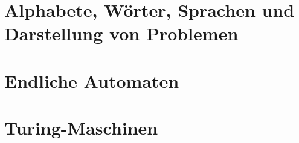 \documentclass{article}
\begin{document}
\newpage





\newsection
\section{Alphabete, Wörter, Sprachen und Darstellung von Problemen}





\newsection
\section{Endliche Automaten}





\newsection
\section{Turing-Maschinen}
\setcounter{subsection}{2}


\end{document}
